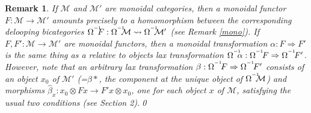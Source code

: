 \documentclass[]{amsart}
\newtheorem{remark}[theorem]{Remark}
\begin{document}
\begin{remark} \label{monf}{\em
If ${\ensuremath{\mathcal{M}}}$ and ${\ensuremath{\mathcal{M}}}'$ are monoidal categories, then a monoidal functor $F:{\ensuremath{\mathcal{M}}}\to {\ensuremath{\mathcal{M}}}'$ amounts precisely
to a homomorphism between the corresponding delooping bicategories
$\Omega^{^{-1}}\hspace{-5pt}F:\Omega^{^{-1}}\hspace{-5pt}{\ensuremath{\mathcal{M}}}\rightsquigarrow
\Omega^{^{-1}}\hspace{-5pt}{\ensuremath{\mathcal{M}}}'$ (see Remark \ref{mono}). If $F,F':{\ensuremath{\mathcal{M}}}\to {\ensuremath{\mathcal{M}}}'$ are monoidal functors,
then a monoidal transformation $\alpha:F\Rightarrow F'$ is the same thing as a  relative to objects
lax transformation
$\Omega^{^{-1}}\hspace{-5pt}\alpha:\Omega^{^{-1}}\hspace{-2pt}F\Rightarrow\Omega^{^{-1}}\hspace{-2pt}F'$.
However, note that an arbitrary lax transformation $\beta:\Omega^{^{-1}}\hspace{-2pt}F\Rightarrow
\Omega^{^{-1}}\hspace{-2pt}F'$ consists of an object $x_0$ of ${\ensuremath{\mathcal{M}}}'$ (=$\beta *$, the component at
the unique object of $\Omega^{^{-1}}\hspace{-5pt}{\ensuremath{\mathcal{M}}}$) and morphisms $\widehat{\beta}_x: x_0\otimes
Fx\to F'\!x\otimes x_0$, one for each object $x$ of ${\ensuremath{\mathcal{M}}}$, satisfying the usual two conditions (see
Section 2).}\qed
\end{remark}
\end{document}
